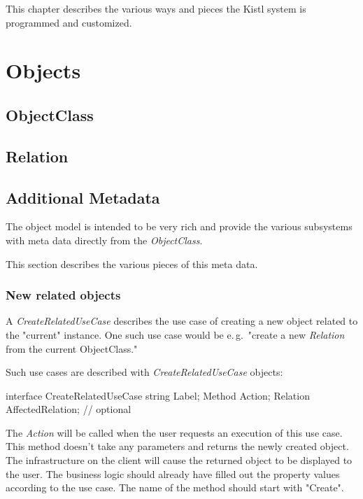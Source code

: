 This chapter describes the various ways and pieces the Kistl system is
programmed and customized.

\section{Objects}

\subsection{ObjectClass}

\subsection{Relation}


\subsection{Additional Metadata}

The object model is intended to be very rich and provide the various
subsystems with meta data directly from the \emph{ObjectClass}.

This section describes the various pieces of this meta data.

\subsubsection{New related objects}

A \emph{CreateRelatedUseCase} describes the use case of creating a new
object related to the "current" instance. One such use case would be
e.\,g.~"create a new \emph{Relation} from the current ObjectClass."

Such use cases are described with \emph{CreateRelatedUseCase} objects:

\begin{CS}
interface CreateRelatedUseCase
{
	string Label;
	Method Action;
	Relation AffectedRelation; // optional
}
\end{CS}

The \emph{Action} will be called when the user requests an execution of
this use case. This method doesn't take any parameters and returns the
newly created object. The infrastructure on the client will cause the
returned object to be displayed to the user. The business logic should
already have filled out the property values according to the use case.
The name of the method should start with "Create".

